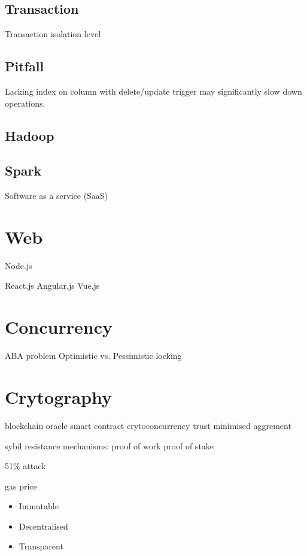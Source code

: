 \documentclass[oneside,reqno]{amsbook}
\begin{document}
\chapter{Transaction}

Transaction isolation level

\chapter{Pitfall}

Lacking index on column with delete/update trigger may significantly slow down operations.

\chapter{Hadoop}

\chapter{Spark}

Software as a service (SaaS)

\part{Web}

Node.js

React.js Angular.js Vue.js


\part{Concurrency}
ABA problem
Optimistic vs. Pessimistic locking

\part{Crytography}

blockchain
oracle
smart contract
crytoconcurrency
trust minimised aggrement

sybil resistance mechanisms:
proof of work
proof of stake

51\% attack

gas price

\begin{itemize}
\item Immutable
\item Decentralised
\item Transparent
\end{itemize}
\end{document}
